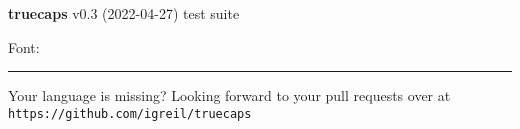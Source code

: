 \documentclass{article}
\begin{document}
\begin{flushright}
	\Large\textbf{truecaps} v0.3 (2022-04-27) test suite\par
	\large Font: 
\end{flushright}


	\def\presection		{\vspace{-1em}}
	\def\postsection	{\vspace{-.5em}\hrule\vspace{.5em}}






%
%


%
%
%
%
%
%
%
%
%
%
%
%
%
%
%
%
%

%
%





\vspace{1em}\hrule\vspace{3em}
\noindent Your language is missing? Looking forward to your pull requests over at 
\texttt{https://github.com/igreil/truecaps}
\end{document}

